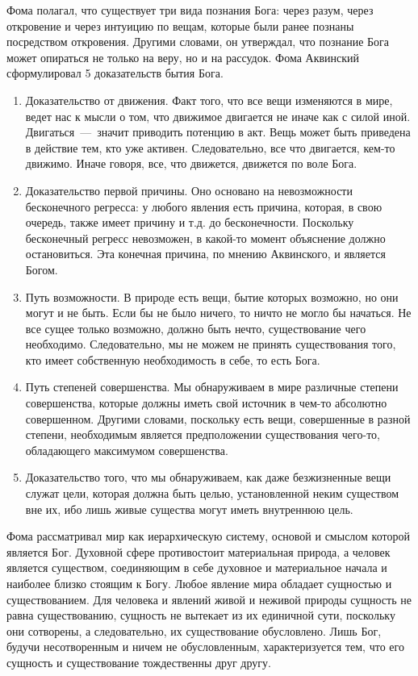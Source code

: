 \documentclass[14pt]{extarticle}
\begin{document}
Фома полагал, что существует три вида познания Бога: через разум, через откровение и через интуицию по вещам, которые были ранее познаны посредством откровения. Другими словами, он утверждал, что познание Бога может опираться не только на веру, но и на рассудок. Фома Аквинский сформулировал 5 доказательств бытия Бога.

\begin{enumerate}
	\item Доказательство от движения. Факт того, что все вещи изменяются в мире, ведет нас к мысли о том, что движимое двигается не иначе как с силой иной. Двигаться~---~значит приводить потенцию в акт. Вещь может быть приведена в действие тем, кто уже активен. Следовательно, все что двигается, кем-то движимо. Иначе говоря, все, что движется, движется по воле Бога.
	\item Доказательство первой причины. Оно основано на невозможности бесконечного регресса: у любого явления есть причина, которая, в свою очередь, также имеет причину и т.д. до бесконечности. Поскольку бесконечный регресс невозможен, в какой-то момент объяснение должно остановиться. Эта конечная причина, по мнению Аквинского, и является Богом.
	\item Путь возможности. В природе есть вещи, бытие которых возможно, но они могут и не быть. Если бы не было ничего, то ничто не могло бы начаться. Не все сущее только возможно, должно быть нечто, существование чего необходимо. Следовательно, мы не можем не принять существования того, кто имеет собственную необходимость в себе, то есть Бога.
	\item Путь степеней совершенства. Мы обнаруживаем в мире различные степени совершенства, которые должны иметь свой источник в чем-то абсолютно совершенном. Другими словами, поскольку есть вещи, совершенные в разной степени, необходимым является предположении существования чего-то, обладающего максимумом совершенства.
	\item Доказательство того, что мы обнаруживаем, как даже безжизненные вещи служат цели, которая должна быть целью, установленной неким существом вне их, ибо лишь живые существа могут иметь внутреннюю цель.
\end{enumerate}

Фома рассматривал мир как иерархическую систему, основой и смыслом которой является Бог. Духовной сфере противостоит материальная природа, а человек является существом, соединяющим в себе духовное и материальное начала и наиболее близко стоящим к Богу. Любое явление мира обладает сущностью и существованием. Для человека и явлений живой и неживой природы сущность не равна существованию, сущность не вытекает из их единичной сути, поскольку они сотворены, а следовательно, их существование обусловлено. Лишь Бог, будучи несотворенным и ничем не обусловленным, характеризуется тем, что его сущность и существование тождественны друг другу.
\end{document}
